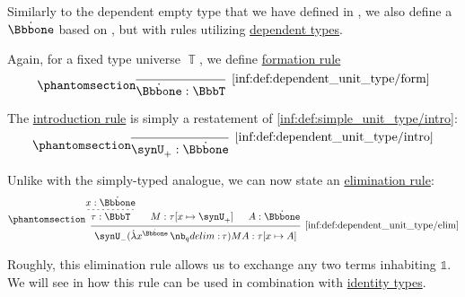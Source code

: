 \begin{definition}\label{def:dependent_unit_type}
  Similarly to the dependent empty type that we have defined in , we also define a  \( \syn\Bbbone \) based on , but with rules utilizing \hyperref[con:dependent_type]{dependent types}.

  Again, for a fixed type universe \( \BbbT \), we define \hyperref[rem:type_theory_rule_classification/form]{formation rule}
  \begin{equation*}\taglabel[\ensuremath{ \Bbbone_{\logic{form}} }]{inf:def:dependent_unit_type/form}
    \begin{prooftree}
      \infer0[\ref{inf:def:dependent_unit_type/form}]{ \syn\Bbbone: \BbbT }
    \end{prooftree}
  \end{equation*}

  The \hyperref[rem:type_theory_rule_classification/intro]{introduction rule} is simply a restatement of \ref{inf:def:simple_unit_type/intro}:
  \begin{equation*}\taglabel[\ensuremath{ \Bbbone_+ }]{inf:def:dependent_unit_type/intro}
    \begin{prooftree}
      \infer0[\ref{inf:def:dependent_unit_type/intro}]{ \synU_+: \syn\Bbbone }
    \end{prooftree}
  \end{equation*}

  Unlike with the simply-typed analogue, we can now state an \hyperref[rem:type_theory_rule_classification/elim]{elimination rule}:
  \begin{equation*}\taglabel[\ensuremath{ \Bbbone_- }]{inf:def:dependent_unit_type/elim}
    \begin{prooftree}
      \hypo{ x: \syn\Bbbone }
      \infer[dashed]1{ \tau: \BbbT }

      \hypo{ M: \tau[x \mapsto \synU_+] }

      \hypo{ A: \syn\Bbbone }

      \infer3[\ref{inf:def:dependent_unit_type/elim}]{ \synU_- (\qabs {x^{\syn\Bbbone}} \tau) M A: \tau[x \mapsto A] }
    \end{prooftree}
  \end{equation*}

  Roughly, this elimination rule allows us to exchange any two terms inhabiting \( \Bbbone \). We will see in  how this rule can be used in combination with \hyperref[def:identity_type]{identity types}.


\end{definition}
